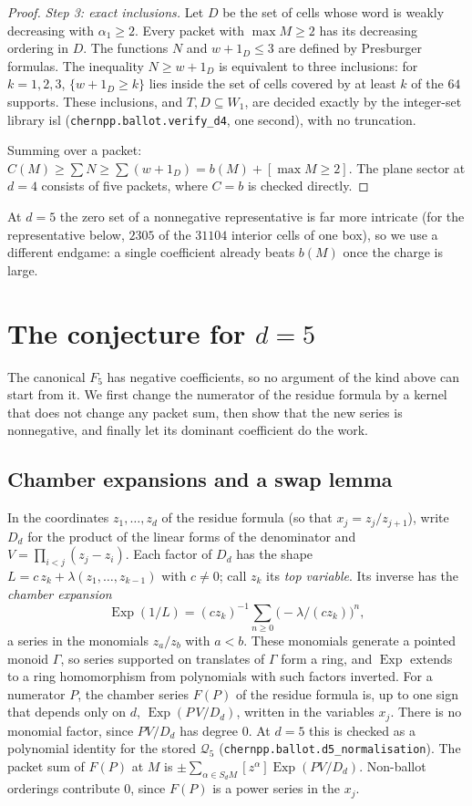 \documentclass[11pt,a4paper]{article}
\theoremstyle{plain}
\theoremstyle{definition}
\theoremstyle{remark}
\begin{document}
\begin{proof}
\emph{Step 3: exact inclusions.} Let $D$ be the set of cells whose word is weakly decreasing with
$\alpha_1 \ge 2$. Every packet with $\max M \ge 2$ has its decreasing ordering in $D$. The
functions $N$ and $w + 1_D \le 3$ are defined by Presburger formulas. The inequality $N \ge w + 1_D$
is equivalent to three inclusions: for $k = 1, 2, 3$, $\{w + 1_D \ge k\}$ lies inside the set of
cells covered by at least $k$ of the $64$ supports. These inclusions, and $T, D \subseteq W_1$, are
decided exactly by the integer-set library isl (\texttt{chernpp.ballot.verify\_d4}, one second),
with no truncation.

Summing over a packet: $C(M) \ge \sum N \ge \sum (w + 1_D) = b(M) + [\max M \ge 2]$. The plane
sector at $d = 4$ consists of five packets, where $C = b$ is checked directly.
\end{proof}

At $d = 5$ the zero set of a nonnegative representative is far more intricate (for the
representative below, $2305$ of the $31104$ interior cells of one box), so we use a different
endgame: a single coefficient already beats $b(M)$ once the charge is large.

\section{The conjecture for $d = 5$}\label{sec:d5}

The canonical $F_5$ has negative coefficients, so no argument of the kind above can start from
it. We first change the numerator of the residue formula by a kernel that does not change any
packet sum, then show that the new series is nonnegative, and finally let its dominant
coefficient do the work.

\subsection{Chamber expansions and a swap lemma}

In the coordinates $z_1, \dots, z_d$ of the residue formula (so that $x_j = z_j/z_{j+1}$), write
$D_d$ for the product of the linear forms of the denominator and $V = \prod_{i<j}(z_j - z_i)$. Each
factor of $D_d$ has the shape $L = c\,z_k + \lambda(z_1, \dots, z_{k-1})$ with $c \ne 0$; call $z_k$
its \emph{top variable}. Its inverse has the \emph{chamber expansion}
\[
  \operatorname{Exp}(1/L) = (c z_k)^{-1} \sum_{n \ge 0} \bigl(-\lambda/(c z_k)\bigr)^n ,
\]
a series in the monomials $z_a/z_b$ with $a < b$. These monomials generate a pointed monoid
$\Gamma$, so series supported on translates of $\Gamma$ form a ring, and $\operatorname{Exp}$
extends to a ring homomorphism from polynomials with such factors inverted. For a numerator $P$,
the chamber series $F(P)$ of the residue formula is, up to one sign that depends only on $d$,
$\operatorname{Exp}(P\,V/D_d)$, written in the variables $x_j$. There is no monomial factor, since
$P V / D_d$ has degree $0$. At $d = 5$ this is checked as a polynomial identity for the stored
$\mathcal Q_5$ (\texttt{chernpp.ballot.d5\_normalisation}). The packet sum of $F(P)$ at $M$ is
$\pm\sum_{\alpha \in S_d M} [z^\alpha]\operatorname{Exp}(P V/D_d)$. Non-ballot orderings
contribute $0$, since $F(P)$ is a power series in the $x_j$.
\end{document}
